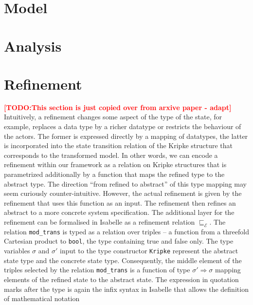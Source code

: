 \documentclass{llncs}
\newcommand{\TODO}[1]{\textcolor{red}{\textbf{[TODO:#1]}}}
\begin{document}
\section{Model}
\label{sec:model}

\section{Analysis}
\label{sec:ana}

\section{Refinement}
\label{sec:ref}
\TODO{This section is just copied over from arxive paper - adapt}
Intuitively, a refinement changes some aspect of the type of
the state, for example, replaces a data type by a richer datatype or
restricts the behaviour of the actors. The former is expressed directly 
by a mapping of datatypes, the latter is incorporated into the state
transition relation of the Kripke structure that corresponds to the 
transformed model.
In other words, we can encode a refinement within our framework
as a relation on Kripke structures that is parametrized additionally by
a function that maps the refined type to the abstract type.
The direction ``from refined to abstract'' of this type mapping may seem 
curiously counter-intuitive. However, the actual refinement is given by the 
refinement that uses this function as an input. The refinement
then refines an abstract to a more concrete system specification. 
The additional layer for the refinement 
can be formalised in Isabelle as a
refinement relation 
$\sqsubseteq_{\mathcal{E}}$. 
The relation \texttt{mod\_trans} is typed as a relation over triples --
a function from a threefold Cartesian product to \texttt{bool}, the 
type containing true and false only.  
The type variables $\sigma$ and $\sigma'$ input to the type constructor 
\texttt{Kripke} represent the abstract state type and the concrete state type. 
Consequently, the middle element of the triples selected by the relation 
\texttt{mod\_trans} is a function of type $\sigma' \Rightarrow \sigma$ 
mapping elements of the refined state to the abstract state.
The expression in quotation marks after the type is again the
infix syntax in Isabelle that allows the definition of mathematical notation
\end{document}
